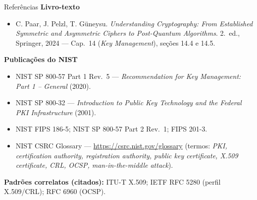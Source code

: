 \documentclass{beamer}
\begin{document}
\begin{frame}{Referências}
    \footnotesize
    \textbf{Livro-texto}
    \begin{itemize}
        \item C. Paar, J. Pelzl, T. Güneysu. \textit{Understanding Cryptography: From Established Symmetric and Asymmetric Ciphers to Post-Quantum Algorithms}. 2.\ ed., Springer, 2024 --- Cap.\ 14 (\textit{Key Management}), seções 14.4 e 14.5.
    \end{itemize}
    \medskip
    \textbf{Publicações do NIST}
    \begin{itemize}
        \item NIST SP 800-57 Part 1 Rev.\ 5 --- \textit{Recommendation for Key Management: Part 1 -- General} (2020).
        \item NIST SP 800-32 --- \textit{Introduction to Public Key Technology and the Federal PKI Infrastructure} (2001).
        \item NIST FIPS 186-5; NIST SP 800-57 Part 2 Rev.\ 1; FIPS 201-3.
        \item NIST CSRC Glossary --- \url{https://csrc.nist.gov/glossary} (termos: \textit{PKI, certification authority, registration authority, public key certificate, X.509 certificate, CRL, OCSP, man-in-the-middle attack}).
    \end{itemize}
    \medskip
    \textbf{Padrões correlatos (citados):} ITU-T X.509; IETF RFC 5280 (perfil X.509/CRL); RFC 6960 (OCSP).
\end{frame}
\end{document}
